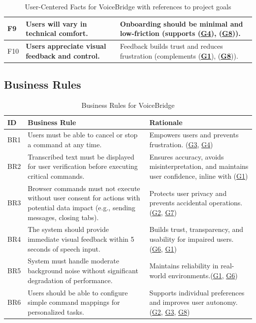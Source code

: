 \documentclass[12pt]{article}
\begin{document}
\begin{table}[H]
\begin{tabularx}{\textwidth}{p{1cm}p{6cm}X}
F9 & \textbf{Users will vary in technical comfort.} & Onboarding should be minimal and low-friction (supports (\textbf{\hyperref[tab:project-goals]{G4}}), (\textbf{\hyperref[tab:project-goals]{G8}})). \\ \hline
F10 & \textbf{Users appreciate visual feedback and control.} & Feedback builds trust and reduces frustration (complements (\textbf{\hyperref[tab:project-goals]{G1}}), (\textbf{\hyperref[tab:project-goals]{G8}})). \\
\bottomrule
\end{tabularx}
\caption{User-Centered Facts for VoiceBridge with references to project goals}
\label{tab:user-facts}
\end{table}



\subsection{Business Rules}

\begin{table}[H]
\centering
\begin{tabularx}{\textwidth}{p{1cm} X X}
\toprule
\textbf{ID} & \textbf{Business Rule} & \textbf{Rationale} \\
\midrule
BR1 & Users must be able to cancel or stop a command at any time. & Empowers users and prevents frustration. (\hyperref[tab:project-goals]{G3}, \hyperref[tab:project-goals]{G4}) \\
BR2 & Transcribed text must be displayed for user verification before executing critical commands. & Ensures accuracy, avoids misinterpretation, and maintains user confidence, inline with (\hyperref[tab:project-goals]{G1}) \\
BR3 & Browser commands must not execute without user consent for actions with potential data impact (e.g., sending messages, closing tabs). & Protects user privacy and prevents accidental operations. (\hyperref[tab:project-goals]{G2}, \hyperref[tab:project-goals]{G7}) \\
BR4 & The system should provide immediate visual feedback within 5 seconds of speech input. & Builds trust, transparency, and usability for impaired users. (\hyperref[tab:project-goals]{G6}, \hyperref[tab:project-goals]{G1}) \\
BR5 & System must handle moderate background noise without significant degradation of performance. & Maintains reliability in real-world environments.(\hyperref[tab:project-goals]{G1}, \hyperref[tab:project-goals]{G6}) \\
BR6 & Users should be able to configure simple command mappings for personalized tasks. & Supports individual preferences and improves user autonomy. (\hyperref[tab:project-goals]{G2}, \hyperref[tab:project-goals]{G3}, \hyperref[tab:project-goals]{G8}) \\
\bottomrule
\end{tabularx}
\caption{Business Rules for VoiceBridge}
\label{tab:business-rules}
\end{table}
\end{document}
